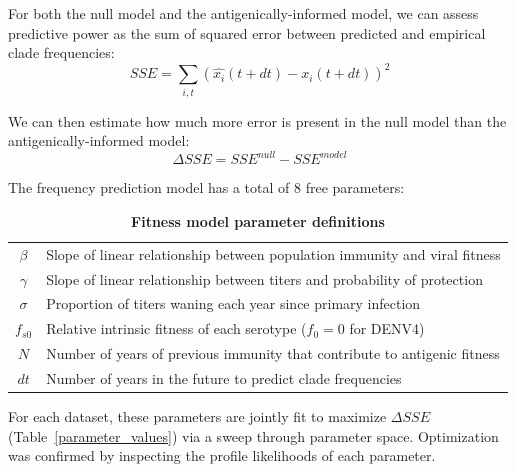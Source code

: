 For both the null model and the antigenically-informed model, we can assess predictive power as the sum of squared error between predicted and empirical clade frequencies:
\begin{equation}
  \label{eq_sse}
SSE = \sum_{i,t} \left( \hat{x_i}(t+dt) - x_{i}(t+dt) \right)^2
\end{equation}

We can then estimate how much more error is present in the null model than the antigenically-informed model:
\begin{equation}
  \label{eq_delta_sse}
\Delta SSE = SSE^{null} - SSE^{model}
\end{equation}

The frequency prediction model has a total of 8 free parameters:
\begin{centering}
\begin{table}[h!]
    \caption[Fitness model parameter definitions]{\textbf{Fitness model parameter definitions}}
    \begin{tabular}{c|l}
      $\beta$ & Slope of linear relationship between population immunity and viral fitness\\
      $\gamma$ & Slope of linear relationship between titers and probability of protection\\
      $\sigma$ & Proportion of titers waning each year since primary infection\\
      $f_{s0}$ & Relative intrinsic fitness of each serotype ($f_0 = 0$ for DENV4)\\
      $N$ & Number of years of previous immunity that contribute to antigenic fitness\\
      $dt$ & Number of years in the future to predict clade frequencies\\
    \end{tabular}
    \label{parameter_definition}
\end{table}
\end{centering}

For each dataset, these parameters are jointly fit to maximize $\Delta SSE$ (Table~\ref{parameter_values}) via a sweep through parameter space.
Optimization was confirmed by inspecting the profile likelihoods of each parameter.





\appendix
\raggedbottom\sloppy

